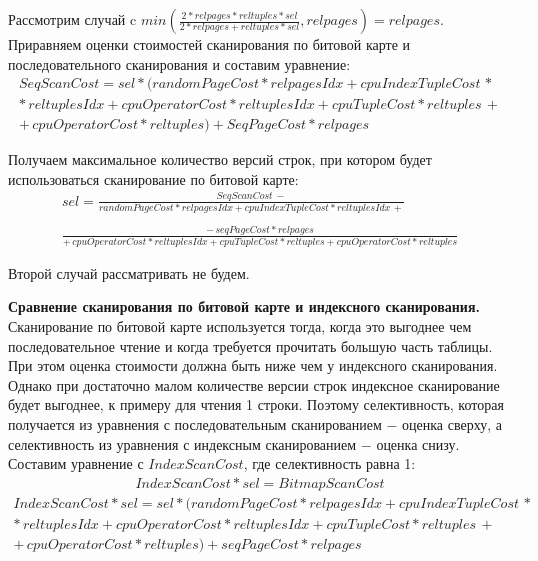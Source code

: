 Рассмотрим случай c $min(\frac{2*relpages*reltuples*sel}{2*relpages+reltuples*sel}, relpages) = relpages$.
Приравняем оценки стоимостей сканирования по битовой карте и последовательного сканирования и составим уравнение:
\begin{equation}
    \begin{array}{cc}
         SeqScanCost = sel * (randomPageCost * relpagesIdx + cpuIndexTupleCost \, * \\
         * \, reltuplesIdx + cpuOperatorCost * reltuplesIdx + cpuTupleCost * reltuples \, + \\
         + \, cpuOperatorCost * reltuples) + SeqPageCost * relpages
    \end{array}
\end{equation}

Получаем максимальное количество версий строк, при котором будет использоваться сканирование по битовой карте:
\begin{equation}
    \begin{array}{cc}
        sel = \frac{SeqScanCost \, - }{randomPageCost * relpagesIdx + cpuIndexTupleCost * reltuplesIdx \, + } \\
        \\
        \frac{- \, seqPageCost * relpages}{+ \, cpuOperatorCost * reltuplesIdx + cpuTupleCost * reltuples + cpuOperatorCost * reltuples }
    \end{array}
\end{equation}

Второй случай рассматривать не будем. 

\textbf{Сравнение сканирования по битовой карте и индексного сканирования.} Сканирование по битовой карте используется тогда, когда это выгоднее чем последовательное чтение и когда требуется прочитать большую часть таблицы. При этом оценка стоимости должна быть ниже чем у индексного сканирования. Однако при достаточно малом количестве версии строк индексное сканирование будет выгоднее, к примеру для чтения 1 строки. Поэтому селективность, которая получается из уравнения с последовательным сканированием $-$ оценка сверху, а селективность из уравнения с индексным сканированием $-$ оценка снизу. Составим уравнение с $IndexScanCost$, где селективность равна 1:
\begin{equation}
    \begin{array}{c}
       IndexScanCost * sel = BitmapScanCost
    \end{array}
\end{equation}
\begin{equation}
\begin{array}{cc}
     IndexScanCost * sel = sel * (randomPageCost * relpagesIdx + cpuIndexTupleCost \, * \\
     * \, reltuplesIdx + cpuOperatorCost * reltuplesIdx + cpuTupleCost * reltuples \, + \\ 
     + \, cpuOperatorCost * reltuples) + seqPageCost * relpages
\end{array}
\end{equation}

